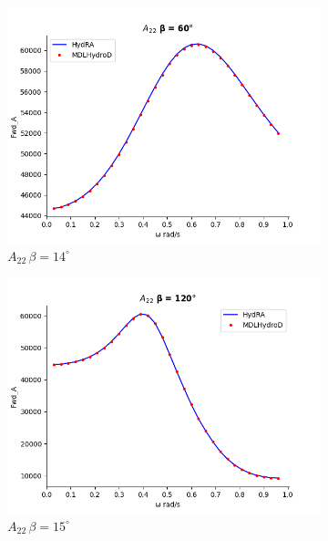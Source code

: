 \begin{figure}[H]
    \centering
    \ContinuedFloat
    \begin{subfigure}[b]{0.45\textwidth}
        \includegraphics[width=\textwidth]{plots/kcs/added_mass/A22 _BETA_60.png}
        \caption{$A_{22} \, \beta = 14^{\circ}$}
    \end{subfigure}
    \begin{subfigure}[b]{0.45\textwidth}
        \includegraphics[width=\textwidth]{plots/kcs/added_mass/A22_BETA_120.png}
        \caption{$A_{22} \, \beta = 15^{\circ}$}
    \end{subfigure}
    \begin{subfigure}[b]{0.45\textwidth}

\end{subfigure}
\end{figure}
